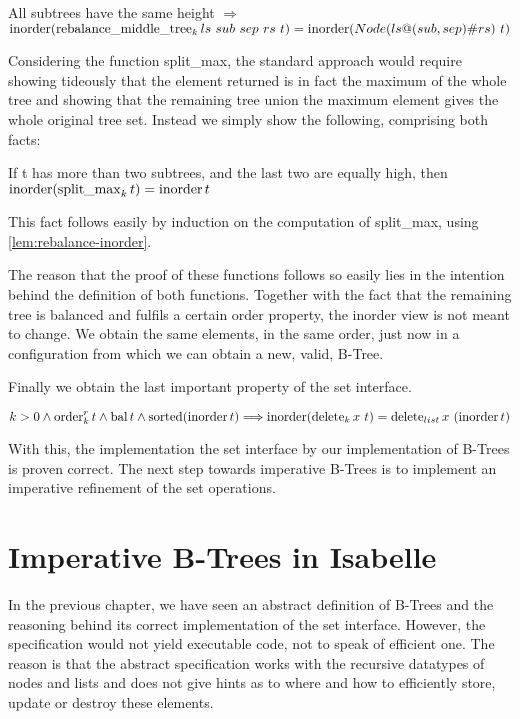 \begin{lemma}
    \label{lem:rebalance-inorder}
    All subtrees have the same height $\Longrightarrow$ \\
    $\operatorname{inorder} (\operatorname{rebalance\_middle\_tree}_k ls\ sub\ sep\ rs\ t) = \operatorname{inorder} (Node (ls@(sub,sep)\#rs)\ t)$
\end{lemma}

Considering the function split\_max,
the standard approach would require showing
tideously that the element returned is in fact the maximum of the whole tree
and showing that the remaining tree union the maximum element
gives the whole original tree set.
Instead we simply show the following,
comprising both facts:

\begin{lemma}
    \label{lem:splitmax-inorder}
    If t has more than two subtrees, and the last two are equally high, then
    $\operatorname{inorder} (\operatorname{split\_max}_k t) = \operatorname{inorder} t$
\end{lemma}

This fact follows easily by induction on the computation of split\_max,
using \autoref{lem:rebalance-inorder}.

The reason that the proof of these functions follows so easily
lies in the intention behind the definition of both functions.
Together with the fact that the remaining tree is balanced and
fulfils a certain order property, the inorder view
is not meant to change.
We obtain the same elements, in the same order,
just now in a configuration from which we can obtain
a new, valid, B-Tree.

Finally we obtain the last important property of the set interface.
\begin{theorem}
    $k > 0 \wedge \operatorname{order}^r_k t \wedge \operatorname{bal} t \wedge \operatorname{sorted}  (\operatorname{inorder} t)\Longrightarrow
    \operatorname{inorder} (\operatorname{delete}_k x\ t) = \operatorname{delete}_{list} x\ (\operatorname{inorder} t)$
\end{theorem}

With this, the implementation the set interface by
our implementation of B-Trees is proven correct.
The next step towards imperative B-Trees is to implement
an imperative refinement of the set operations.

\chapter{Imperative B-Trees in Isabelle}

In the previous chapter, we have seen
an abstract definition of B-Trees and the reasoning
behind its correct implementation of the set interface.
However, the specification would not yield executable
code, not to speak of efficient one.
The reason is that the abstract specification works with
the recursive datatypes of nodes and lists
and does not give hints as to where and how to
efficiently store, update or destroy these elements.


